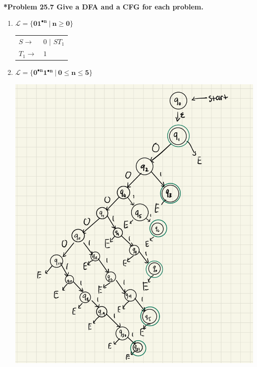 \documentclass{article}
\begin{document}
    \noindent\\[0.25in]
    \noindent\textbf{*Problem 25.7 Give a DFA and a CFG for each problem.}
    \begin{enumerate}[label=(\alph*)]
        \item $\mathbf{\mathcal{L}=\{01^{\bullet n}\ |\ n\ge 0\}}$
        \begin{center}

            \begin{tabular}{l l}
                $S \rightarrow$ & $0$ $|$ $ST_1$\\
                $T_1 \rightarrow$ & $1$
            \end{tabular}
        \end{center}
        \item $\mathbf{\mathcal{L}=\{0^{\bullet n}1^{\bullet n}\ |\ 0\le n\le 5\}}$
        \begin{center}
            \includegraphics[scale=0.25]{p25_7b.jpg}


\end{center}
\end{enumerate}
\end{document}
